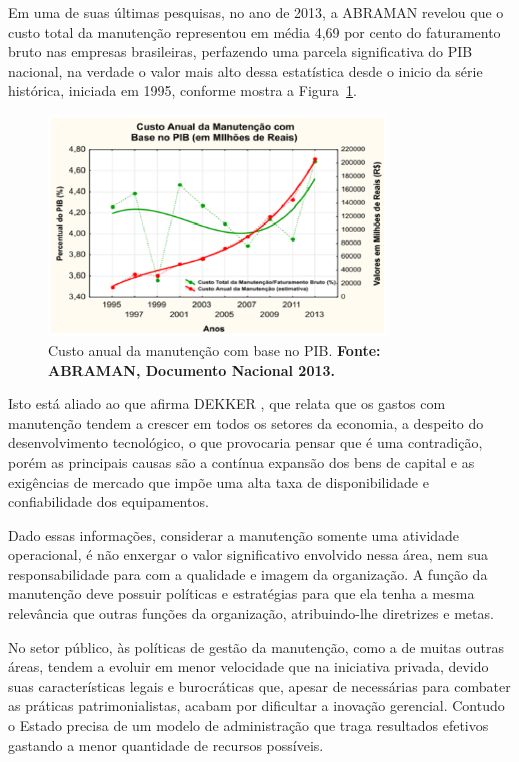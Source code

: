 Em uma de suas últimas pesquisas, no ano de 2013, a ABRAMAN revelou que o custo total da manutenção representou em média 4,69 por cento do faturamento bruto nas empresas brasileiras, perfazendo uma parcela significativa do PIB nacional, na verdade o valor mais alto dessa estatística desde o inicio da série histórica, iniciada em 1995, conforme mostra a Figura~\ref{custo_anual_2013}.

\graphicspath{{figuras/}}
\begin{figure}[H]
\centering
\includegraphics[width=0.8\textwidth]{dados_pib_pesquisa_intro.eps}
\caption{Custo anual da manutenção com base no PIB. \textbf{Fonte: ABRAMAN, Documento Nacional 2013.}}
\label{custo_anual_2013}
\end{figure}

Isto está aliado ao que afirma DEKKER \cite{dekker1998}, que relata que os gastos com manutenção tendem a crescer em todos os setores da economia, a despeito do desenvolvimento tecnológico, o que provocaria pensar que é uma contradição, porém as principais causas são a contínua expansão dos bens de capital e as exigências de mercado que impõe uma alta taxa de disponibilidade e confiabilidade dos equipamentos.

Dado essas informações, considerar a manutenção somente uma atividade operacional, é não enxergar o valor significativo envolvido nessa área, nem sua responsabilidade para com a qualidade e imagem da organização. A função da manutenção deve possuir políticas e estratégias para que ela tenha a mesma relevância que outras funções da organização, atribuindo-lhe diretrizes e metas.	

No setor público, às políticas de gestão da manutenção, como a de muitas outras áreas, tendem a evoluir em menor velocidade que na iniciativa privada, devido suas características legais e burocráticas que, apesar de necessárias para combater as práticas patrimonialistas, acabam por dificultar a inovação gerencial. Contudo o Estado precisa de um modelo de administração que traga resultados efetivos gastando a menor quantidade de recursos possíveis.

